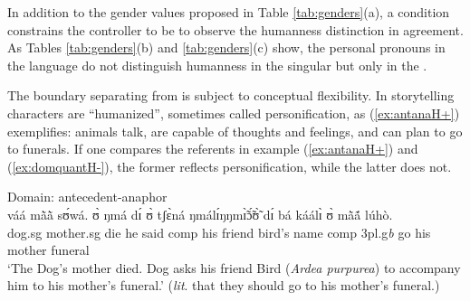 \begin{exe}
\begin{exe}
\begin{exe}
\begin{exe}
\begin{exe}
\begin{exe}
\begin{exe}
\begin{exe}
\begin{exe}
\begin{exe}
\begin{exe}
\begin{table}


\end{table}



  In addition to the gender values proposed in Table \ref{tab:genders}(a),  a condition constrains the controller to be  to observe the humanness distinction in agreement. As Tables \ref{tab:genders}(b)  and   \ref{tab:genders}(c) show, the personal pronouns in the language do not distinguish humanness in the singular but only in the .
 
 The boundary separating  from  is subject to conceptual flexibility. In storytelling  characters are ``humanized'', sometimes called personification, as (\ref{ex:antanaH+}) exemplifies: animals talk, are capable of thoughts and feelings, and can plan to go to funerals. If one compares the  referents in example (\ref{ex:antanaH+}) and (\ref{ex:domquantH-}), the former reflects personification, while the latter does not.
 

  \ea\label{ex:antanaH+}{\rm Domain: antecedent-anaphor}\\
\gll   váá  mã̀ã̀  sʊ́wá.   ʊ̀   ŋmá   dɪ́   ʊ̀  tʃɛ̀ná  ŋmálɪ́ŋŋmɪ̃̀ɔ̃́ʊ̃̀   dɪ́   bá  káálɪ̀  ʊ̀ mã̀ã́  lúhò.\\
    dog.{\sc sg} mother.{\sc sg} {die} {he} {said} {\sc comp} {his} {friend} {bird's name} {\sc comp} {{\sc 3pl.g}{\it b}} {go} {his} {mother} {funeral}\\
\glt `The Dog's mother died. Dog asks his friend Bird ({\it Ardea purpurea}) to accompany him to his mother's funeral.'  ({\it lit}. that they should go to his mother's funeral.) 
\z


\end{exe}
\end{exe}
\end{exe}
\end{exe}
\end{exe}
\end{exe}
\end{exe}
\end{exe}
\end{exe}
\end{exe}
\end{exe}
